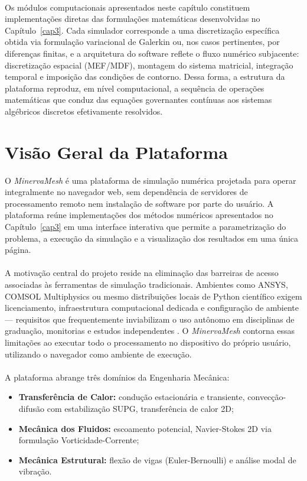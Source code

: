 \paragraph{}Os módulos computacionais apresentados neste capítulo constituem implementações diretas das formulações matemáticas desenvolvidas no Capítulo~\ref{cap3}. Cada simulador corresponde a uma discretização específica obtida via formulação variacional de Galerkin ou, nos casos pertinentes, por diferenças finitas, e a arquitetura do software reflete o fluxo numérico subjacente: discretização espacial (MEF/MDF), montagem do sistema matricial, integração temporal e imposição das condições de contorno. Dessa forma, a estrutura da plataforma reproduz, em nível computacional, a sequência de operações matemáticas que conduz das equações governantes contínuas aos sistemas algébricos discretos efetivamente resolvidos.

\section{Visão Geral da Plataforma}
\label{sec:visao_geral}

O \textit{MinervaMesh} é uma plataforma de simulação numérica projetada para operar integralmente no navegador web, sem dependência de servidores de processamento remoto nem instalação de software por parte do usuário. A plataforma reúne implementações dos métodos numéricos apresentados no Capítulo~\ref{cap3} em uma interface interativa que permite a parametrização do problema, a execução da simulação e a visualização dos resultados em uma única página.

\paragraph{}A motivação central do projeto reside na eliminação das barreiras de acesso associadas às ferramentas de simulação tradicionais. Ambientes como ANSYS, COMSOL Multiphysics ou mesmo distribuições locais de Python científico exigem licenciamento, infraestrutura computacional dedicada e configuração de ambiente --- requisitos que frequentemente inviabilizam o uso autônomo em disciplinas de graduação, monitorias e estudos independentes \cite{Anjos2024}. O \textit{MinervaMesh} contorna essas limitações ao executar todo o processamento no dispositivo do próprio usuário, utilizando o navegador como ambiente de execução.

\paragraph{}A plataforma abrange três domínios da Engenharia Mecânica:
\begin{itemize}
    \item \textbf{Transferência de Calor:} condução estacionária e transiente, convecção-difusão com estabilização SUPG, transferência de calor 2D;
    \item \textbf{Mecânica dos Fluidos:} escoamento potencial, Navier-Stokes 2D via formulação Vorticidade-Corrente;
    \item \textbf{Mecânica Estrutural:} flexão de vigas (Euler-Bernoulli) e análise modal de vibração.
\end{itemize}

